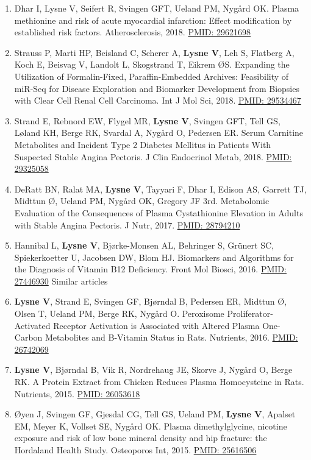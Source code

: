 \documentclass[11pt, a4paper]{awesome-cv}
\begin{document}
\begin{enumerate}
\item
  Dhar I, Lysne V, Seifert R, Svingen GFT, Ueland PM, Nygård OK. Plasma methionine and risk of acute myocardial infarction: Effect modification by established risk factors. Atherosclerosis, 2018. \href{https://www.ncbi.nlm.nih.gov/pubmed/29621698}{PMID: 29621698}
\item
  Strauss P, Marti HP, Beisland C, Scherer A, \textbf{Lysne V}, Leh S, Flatberg A, Koch E, Beisvag V, Landolt L, Skogstrand T, Eikrem ØS. Expanding the Utilization of Formalin-Fixed, Paraffin-Embedded Archives: Feasibility of miR-Seq for Disease Exploration and Biomarker Development from Biopsies with Clear Cell Renal Cell Carcinoma. Int J Mol Sci, 2018. \href{https://www.ncbi.nlm.nih.gov/pubmed/29534467}{PMID: 29534467}
\item
  Strand E, Rebnord EW, Flygel MR, \textbf{Lysne V}, Svingen GFT, Tell GS, Løland KH, Berge RK, Svardal A, Nygård O, Pedersen ER. Serum Carnitine Metabolites and Incident Type 2 Diabetes Mellitus in Patients With Suspected Stable Angina Pectoris. J Clin Endocrinol Metab, 2018. \href{https://www.ncbi.nlm.nih.gov/pubmed/29325058}{PMID: 29325058}
\item
  DeRatt BN, Ralat MA, \textbf{Lysne V}, Tayyari F, Dhar I, Edison AS, Garrett TJ, Midttun Ø, Ueland PM, Nygård OK, Gregory JF 3rd. Metabolomic Evaluation of the Consequences of Plasma Cystathionine Elevation in Adults with Stable Angina Pectoris. J Nutr, 2017. \href{https://www.ncbi.nlm.nih.gov/pubmed/28794210}{PMID: 28794210}
\item
  Hannibal L, \textbf{Lysne V}, Bjørke-Monsen AL, Behringer S, Grünert SC, Spiekerkoetter U, Jacobsen DW, Blom HJ. Biomarkers and Algorithms for the Diagnosis of Vitamin B12 Deficiency. Front Mol Biosci, 2016. \href{https://www.ncbi.nlm.nih.gov/pubmed/}{PMID: 27446930}
  Similar articles
\item
  \textbf{Lysne V}, Strand E, Svingen GF, Bjørndal B, Pedersen ER, Midttun Ø, Olsen T, Ueland PM, Berge RK, Nygård O. Peroxisome Proliferator-Activated Receptor Activation is Associated with Altered Plasma One-Carbon Metabolites and B-Vitamin Status in Rats. Nutrients, 2016. \href{https://www.ncbi.nlm.nih.gov/pubmed/26742069}{PMID: 26742069}
\item
  \textbf{Lysne V}, Bjørndal B, Vik R, Nordrehaug JE, Skorve J, Nygård O, Berge RK. A Protein Extract from Chicken Reduces Plasma Homocysteine in Rats. Nutrients, 2015. \href{https://www.ncbi.nlm.nih.gov/pubmed/26053618}{PMID: 26053618}
\item
  Øyen J, Svingen GF, Gjesdal CG, Tell GS, Ueland PM, \textbf{Lysne V}, Apalset EM, Meyer K, Vollset SE, Nygård OK. Plasma dimethylglycine, nicotine exposure and risk of low bone mineral density and hip fracture: the Hordaland Health Study. Osteoporos Int, 2015. \href{https://www.ncbi.nlm.nih.gov/pubmed/25616506}{PMID: 25616506}
\end{enumerate}
\end{document}
